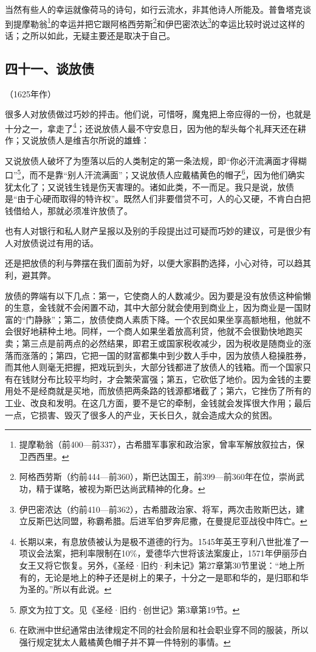 \par 当然有些人的幸运就像荷马的诗句，如行云流水，非其他诗人所能及。普鲁塔克谈到提摩勒翁\footnote{提摩勒翁（前400—前337），古希腊军事家和政治家，曾率军解放叙拉古，保卫西西里。}的幸运并把它跟阿格西劳斯\footnote{阿格西劳斯（约前444—前360），斯巴达国王，前399—前360年在位，崇尚武功，精于谋略，被视为斯巴达尚武精神的化身。}和伊巴密浓达\footnote{伊巴密浓达（约前410—前362），古希腊政治家、将军，两次击败斯巴达，建立反斯巴达同盟，称霸希腊。后进军伯罗奔尼撒，在曼提尼亚战役中阵亡。}的幸运比较时说过这样的话；之所以如此，无疑主要还是取决于自己。




\subsection*{四十一、谈放债}
\begin{center}
    （1625年作）
\end{center}
\par 很多人对放债做过巧妙的抨击。他们说，可惜呀，魔鬼把上帝应得的一份，也就是十分之一，拿走了\footnote{长期以来，有息放债被认为是极不道德的行为。1545年英王亨利八世批准了一项议会法案，把利率限制在10\%，爱德华六世将该法案废止，1571年伊丽莎白女王又将它恢复。另外，《圣经·旧约·利未记》第27章第30节里说：“地上所有的，无论是地上的种子还是树上的果子，十分之一是耶和华的，是归耶和华为圣的。”所以有此说。}；还说放债人最不守安息日，因为他的犁头每个礼拜天还在耕作；又说放债人是维吉尔所说的雄蜂：
\par 又说放债人破坏了为堕落以后的人类制定的第一条法规，即“你必汗流满面才得糊口”\footnote{原文为拉丁文。见《圣经·旧约·创世记》第3章第19节。}，而不是靠“别人汗流满面”；又说放债人应戴橘黄色的帽子\footnote{在欧洲中世纪通常由法律规定不同的社会阶层和社会职业穿不同的服装，所以强行规定犹太人戴橘黄色帽子并不算一件特别的事情。}，因为他们确实犹太化了；又说钱生钱是伤天害理的。诸如此类，不一而足。我只是说，放债是“由于心硬而取得的特许权”。既然人们非要借贷不可，人的心又硬，不肯白白把钱借给人，那就必须准许放债了。
\par 也有人对银行和私人财产呈报以及别的手段提出过可疑而巧妙的建议，可是很少有人对放债说过有用的话。
\par 还是把放债的利与弊摆在我们面前为好，以便大家斟酌选择，小心对待，可以趋其利，避其弊。
\par 放债的弊端有以下几点：第一，它使商人的人数减少。因为要是没有放债这种偷懒的生意，金钱就不会闲置不动，其中大部分就会使用到商业上，因为商业是一国财富的“门静脉”；第二，放债使商人素质下降。一个农民如果坐享高额地租，他就不会很好地耕种土地。同样，一个商人如果坐着放高利贷，他就不会很勤快地跑买卖；第三点是前两点的必然结果，即君王或国家税收减少，因为税收是随商业的涨落而涨落的；第四，它把一国的财富都集中到少数人手中，因为放债人稳操胜券，而其他人则毫无把握，把戏玩到头，大部分钱都进了放债人的钱箱。而一个国家只有在钱财分布比较平均时，才会繁荣富强；第五，它砍低了地价。因为金钱的主要用处不是经商就是买地，而放债把两条路的钱源都堵截了；第六，它挫伤了所有的工业、改良和发明。在这几方面，要不是它的牵制，金钱就会发挥很大作用；最后一点，它损害、毁灭了很多人的产业，天长日久，就会造成大众的贫困。
